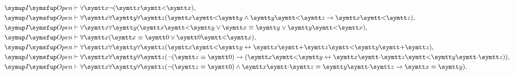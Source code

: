 \begin{Thm}
\begin{align}
		\OpenFormulaInduction & \provable \forall \obj{x}
		\lnot \paren{\obj{x} \obj{<} \obj{x}},
		\label{eq:iopennonreflexivityraw}                                                                                                                                                                 \\
		\OpenFormulaInduction & \provable \forall \obj{x} \forall \obj{y} \forall \obj{z}
		\paren{\obj{x} \obj{<} \obj{y} \land \obj{y} \obj{<} \obj{z} \to \obj{x} \obj{<} \obj{z}},
		\label{eq:iopentransitionraw}                                                                                                                                                                     \\
		\OpenFormulaInduction & \provable \forall \obj{x} \forall \obj{y}
		\paren{\obj{x} \obj{<} \obj{y} \lor \obj{x} \objeq \obj{y} \lor \obj{y} \obj{<} \obj{x}},
		\label{eq:iopenlinerorder}                                                                                                                                                                        \\
		\OpenFormulaInduction & \provable \forall \obj{x}
		\paren{\obj{x} \objeq \obj{0} \lor \obj{0} \obj{<} \obj{x}},
		\label{eq:iopen0minimum}                                                                                                                                                                          \\
		\OpenFormulaInduction & \provable \forall \obj{x} \forall \obj{y} \forall \obj{z}
		\paren{\obj{x} \obj{<} \obj{y} \formulaequiv \obj{x} \obj{+} \obj{z} \obj{<} \obj{y} \obj{+} \obj{z}},
		\label{eq:iopencalcorderaddition}                                                                                                                                                                 \\
		\OpenFormulaInduction & \provable \forall \obj{x} \forall \obj{y} \forall \obj{z}
		\paren{\lnot \paren{\obj{z} \objeq \obj{0}} \to \paren{\obj{x} \obj{<} \obj{y} \formulaequiv \obj{x} \obj{\cdot} \obj{z} \obj{<} \obj{y} \obj{\cdot} \obj{z}}},
		\label{eq:iopencalcordermult}                                                                                                                                                                     \\
		\OpenFormulaInduction & \provable \forall \obj{x} \forall \obj{y} \forall \obj{z}
		\paren{\lnot \paren{\obj{z} \objeq \obj{0}} \land \obj{x} \obj{\cdot} \obj{z} \objeq \obj{y} \obj{\cdot} \obj{z} \to \obj{x} \objeq \obj{y}}.
		\label{eq:iopendivision}
	\end{align}
\end{Thm}

